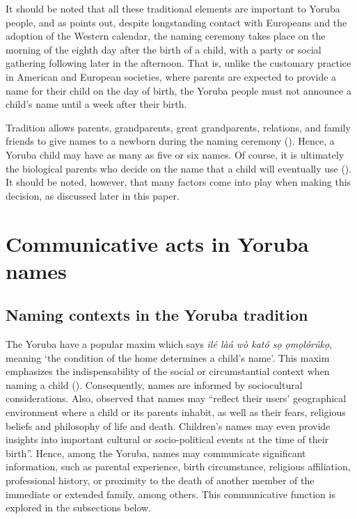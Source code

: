 \documentclass[output=paper,colorlinks,citecolor=brown]{langscibook}
\begin{document}
It should be noted that all these traditional elements are important to Yoruba people, and as \citet[116]{Akinyemi2005} points out, despite longstanding contact with Europeans and the adoption of the Western calendar, the naming ceremony takes place on the morning of the eighth day after the birth of a child, with a party or social gathering following later in the afternoon. That is, unlike the customary practice in American and European societies, where parents are expected to provide a name for their child on the day of birth, the Yoruba people must not announce a child's name until a week after their birth.

Tradition allows parents, grandparents, great grandparents, relations, and family friends to give names to a newborn during the naming ceremony (\citealt[116]{Akinyemi2005}). Hence, a Yoruba child may have as many as five or six names. Of course, it is ultimately the biological parents who decide on the name that a child will eventually use (\cite[116]{Akinyemi2005}). It should be noted, however, that many factors come into play when making this decision, as discussed later in this paper.

\section{Communicative acts in Yoruba names} \label{SEC3-Communicative Acts}

\subsection{Naming contexts in the Yoruba tradition}

The Yoruba have a popular maxim which says \textit{ilé làá wò kató sọ ọmọlórúkọ}, meaning ‘the condition of the home determines a child’s name’. This maxim emphasizes the indispensability of the social or circumstantial context when naming a child (\cite{Ehineni2019}). Consequently, names are informed by sociocultural considerations. Also, \citet[163]{Obeng1998} observed that names may “reflect their users' geographical environment where a child or its parents inhabit, as well as their fears, religious beliefs and philosophy of life and death. Children’s names may even provide insights into important cultural or socio-political events at the time of their birth”. Hence, among the Yoruba, names may communicate significant information, such as parental experience, birth circumstance, religious affiliation, professional history, or proximity to the death of another member of the immediate or extended family, among others. This communicative function is explored in the subsections below.
\end{document}
